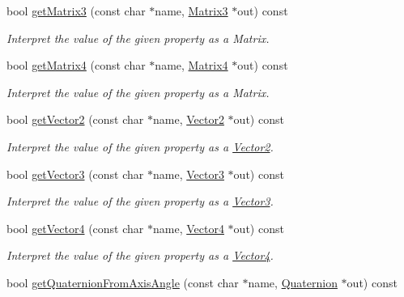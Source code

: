 \begin{DoxyCompactItemize}
bool \hyperlink{class_i_dream_sky_1_1_key_value_pairs_a1875267e815563e0b174ac64b1f7af4c}{get\+Matrix3} (const char $\ast$name, \hyperlink{class_i_dream_sky_1_1_matrix3}{Matrix3} $\ast$out) const 
\begin{DoxyCompactList}\small\item\em Interpret the value of the given property as a Matrix. \end{DoxyCompactList}\item 
bool \hyperlink{class_i_dream_sky_1_1_key_value_pairs_a9b098803c46bfeb1c350d83bd0ecc64f}{get\+Matrix4} (const char $\ast$name, \hyperlink{class_i_dream_sky_1_1_matrix4}{Matrix4} $\ast$out) const 
\begin{DoxyCompactList}\small\item\em Interpret the value of the given property as a Matrix. \end{DoxyCompactList}\item 
bool \hyperlink{class_i_dream_sky_1_1_key_value_pairs_a2546be8e374f1776394ba79b9a75965e}{get\+Vector2} (const char $\ast$name, \hyperlink{class_i_dream_sky_1_1_vector2}{Vector2} $\ast$out) const 
\begin{DoxyCompactList}\small\item\em Interpret the value of the given property as a \hyperlink{class_i_dream_sky_1_1_vector2}{Vector2}. \end{DoxyCompactList}\item 
bool \hyperlink{class_i_dream_sky_1_1_key_value_pairs_a82975cd03f56b99980347c02266889a9}{get\+Vector3} (const char $\ast$name, \hyperlink{class_i_dream_sky_1_1_vector3}{Vector3} $\ast$out) const 
\begin{DoxyCompactList}\small\item\em Interpret the value of the given property as a \hyperlink{class_i_dream_sky_1_1_vector3}{Vector3}. \end{DoxyCompactList}\item 
bool \hyperlink{class_i_dream_sky_1_1_key_value_pairs_aa47ea3ccd89e858fef1e0775bad25d40}{get\+Vector4} (const char $\ast$name, \hyperlink{class_i_dream_sky_1_1_vector4}{Vector4} $\ast$out) const 
\begin{DoxyCompactList}\small\item\em Interpret the value of the given property as a \hyperlink{class_i_dream_sky_1_1_vector4}{Vector4}. \end{DoxyCompactList}\item 
bool \hyperlink{class_i_dream_sky_1_1_key_value_pairs_a04430ffbbe4489521d042e2a34cd6077}{get\+Quaternion\+From\+Axis\+Angle} (const char $\ast$name, \hyperlink{class_i_dream_sky_1_1_quaternion}{Quaternion} $\ast$out) const 

\end{DoxyCompactItemize}
